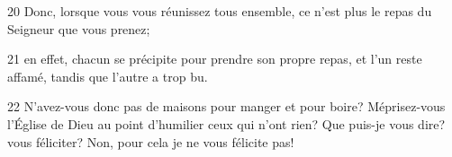 20 Donc, lorsque vous vous réunissez tous ensemble, ce n’est plus le repas du Seigneur que vous prenez;

21 en effet, chacun se précipite pour prendre son propre repas, et l’un reste affamé, tandis que l’autre a trop bu.

22 N’avez-vous donc pas de maisons pour manger et pour boire? Méprisez-vous l’Église de Dieu au point d’humilier ceux qui n’ont rien? Que puis-je vous dire? vous féliciter? Non, pour cela je ne vous félicite pas!
